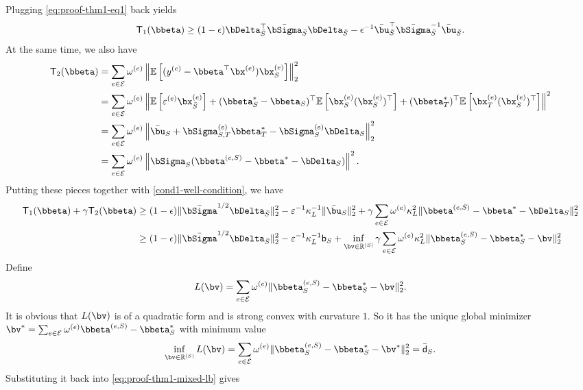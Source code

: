 \documentclass[10pt]{article}
\numberwithin{equation}{section}
\begin{document}
Plugging \eqref{eq:proof-thm1-eq1} back yields
\begin{align}
\label{eq:proof-thm1-t1-lb}
	\mathsf{T}_1(\bbeta) \ge (1-\epsilon) \bDelta_{\bar{S}}^\top \bar{\bSigma}_{\bar{S}} \bDelta_{\bar{S}} - \epsilon^{-1} \bar{\bu}_{\bar{S}}^\top \bar{\bSigma}_{\bar{S}}^{-1} \bar{\bu}_{\bar{S}}.
\end{align}
At the same time, we also have
\begin{align*}
	\mathsf{T}_2(\bbeta) &= \sum_{e\in \mathcal{E}} \omega^{(e)} \left\|\mathbb{E} \left[(y^{(e)} - \bbeta^\top \bx^{(e)}) \bx_S^{(e)}\right]\right\|_2^2 \\
	&= \sum_{e\in \mathcal{E}} \omega^{(e)} \left\| \mathbb{E} \left[\varepsilon^{(e)} \bx_{\bar{S}}^{(e)} \right] + (\bbeta^*_S - \bbeta_S)^\top \mathbb{E} \left[\bx_S^{(e)} (\bx_S^{(e)})^\top\right] + (\bbeta_T^*)^\top \mathbb{E} \left[\bx_T^{(e)} (\bx_S^{(e)})^\top\right] \right\|^2 \\
	&= \sum_{e\in \mathcal{E}} \omega^{(e)} \left\| \bar{\bu}_{S} + \bSigma^{(e)}_{S,T} \bbeta_T^* - \bSigma^{(e)}_S \bDelta_S\right\|_2^2 \\
	&= \sum_{e\in \mathcal{E}} \omega^{(e)} \left\| \bSigma_S(\bbeta^{(e, S)} - \bbeta^* - \bDelta_S) \right\|^2.
\end{align*} Putting these pieces together with \cref{cond1-well-condition}, we have
\begin{align}
	\mathsf{T}_1(\bbeta) + \gamma \mathsf{T}_2(\bbeta) & \ge (1-\epsilon)  \|\bar{\bSigma}^{1/2}\bDelta_{\bar{S}}\|_2^2 - \varepsilon^{-1} \kappa_L^{-1} \|\bar{\bu}_{S}\|_2^2 + \gamma \sum_{e\in \mathcal{E}} \omega^{(e)} \kappa_L^2 \| \bbeta^{(e,S)} - \bbeta^* - \bDelta_S\|^2_2 \nonumber \\
	&\ge (1-\epsilon) \|\bar{\bSigma}^{1/2}\bDelta_{\bar{S}}\|_2^2 - \varepsilon^{-1} \kappa_L^{-1} \mathsf{b}_{S} + \inf_{\bv \in \mathbb{R}^{|S|}}\gamma \sum_{e\in \mathcal{E}} \omega^{(e)} \kappa_L^2 \| \bbeta^{(e,S)}_S - \bbeta^*_S - \bv\|^2_2 \label{eq:proof-thm1-mixed-lb}
\end{align}
Define 
\begin{align*}
	L(\bv) = \sum_{e\in \mathcal{E}} \omega^{(e)} \| \bbeta^{(e,S)}_S - \bbeta^*_S - \bv\|^2_2.
\end{align*} It is obvious that $L(\bv)$ is of a quadratic form and is strong convex with curvature $1$. So it has the unique global minimizer $\bv^*=\sum_{e\in \mathcal{E}}\omega^{(e)} \bbeta^{(e,S)} -\bbeta_S^*$ with minimum value
\begin{align}
\label{eq:j-to-bs}
	\inf_{\bv \in \mathbb{R}^{|S|}} L(\bv) = \sum_{e\in \mathcal{E}} \omega^{(e)} \|\bbeta_S^{(e,S)} - \bbeta_S^* - \bv^*\|_2^2 = \bar{\mathsf{d}}_S.
\end{align} Substituting it back into \eqref{eq:proof-thm1-mixed-lb} gives
\end{document}

